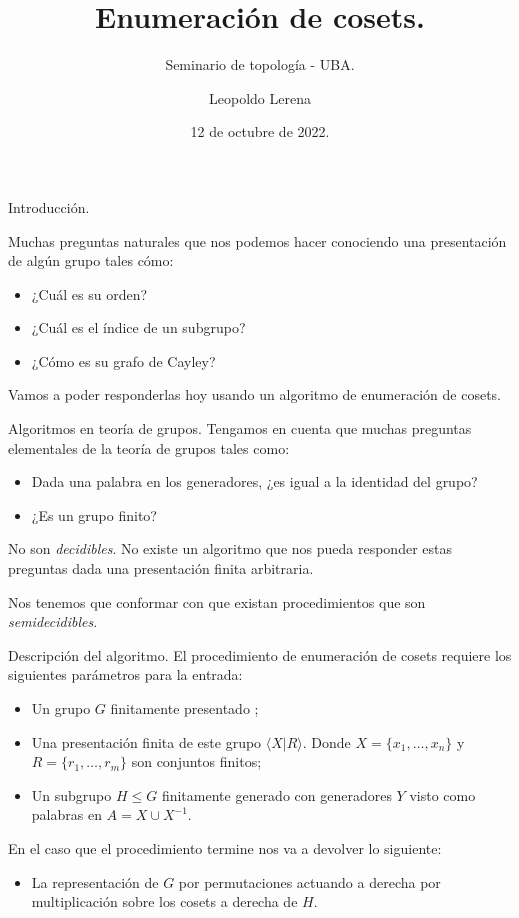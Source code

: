 \documentclass[aspectratio=169, 9pt]{beamer}
\title{Enumeración de cosets.}
\subtitle{Seminario de topología - UBA.}
\date{12 de octubre de 2022.}
\author{Leopoldo Lerena}
\institute{Universidad de Buenos Aires}
\newcommand{\fg}{finitamente generado }
\newcommand{\fp}{finitamente presentado }
\begin{document}
\maketitle

\begin{frame}[fragile]{Introducción.}


Muchas preguntas naturales que nos podemos hacer conociendo una presentación de algún grupo tales cómo:

\begin{itemize}
	\item ¿Cuál es su orden?
	\pause
	\item ¿Cuál es 	el índice de un subgrupo?
	\pause
	\item ¿Cómo es su grafo de Cayley?
	\pause
\end{itemize}

Vamos a poder responderlas hoy usando un algoritmo de enumeración de cosets.
\end{frame}

\begin{frame}[fragile]{Algoritmos en teoría de grupos.}
	Tengamos en cuenta que muchas preguntas elementales de la teoría de grupos tales como:
	\begin{itemize}
		\item Dada una palabra en los generadores, ¿es igual a la identidad del grupo?
		\pause
		\item ¿Es un grupo finito?
	\end{itemize}
	\pause
	No son \textit{decidibles}. 
	No existe un algoritmo que nos pueda responder estas preguntas dada una presentación finita arbitraria.
	\medskip
	
	\pause
	
	
	Nos tenemos que conformar con que existan procedimientos que son \textit{semidecidibles}. 
\end{frame}

\begin{frame}[fragile]{Descripción del algoritmo.}
	El procedimiento de enumeración de cosets requiere los siguientes parámetros para la entrada:
	\begin{itemize}
		\item Un grupo $G$ \fp;
		\pause
		\item Una presentación finita de este grupo $\langle X | R \rangle$.
			Donde $X = \{ x_1, \dots, x_n \}$ y $R = \{ r_1, \dots, r_m \}$ son conjuntos finitos;
 		\pause
		\item Un subgrupo $H \le G$  \fg con generadores $Y$ visto como palabras en $A = X \cup X^{-1}$.
	\end{itemize}
	\pause
	\medskip
	
	En el caso que el procedimiento termine nos va a devolver lo siguiente:
	\pause
	\begin{itemize}
		\item La representación de $G$ por permutaciones actuando a derecha por multiplicación sobre los cosets a derecha de $H$.
	\end{itemize}  
\end{frame}
\end{document}

